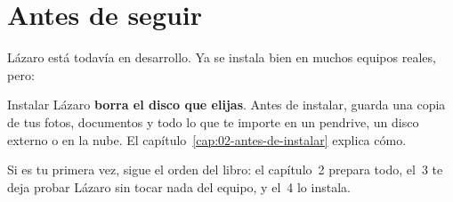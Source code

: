 \section{Antes de seguir}

Lázaro está todavía en desarrollo. Ya se instala bien en muchos equipos
reales, pero:
\begin{cuidado}
Instalar Lázaro \textbf{borra el disco que elijas}. Antes de instalar,
guarda una copia de tus fotos, documentos y todo lo que te importe en un
pendrive, un disco externo o en la nube. El capítulo~\ref{cap:02-antes-de-instalar}
explica cómo.
\end{cuidado}

Si es tu primera vez, sigue el orden del libro: el capítulo~2 prepara todo,
el~3 te deja probar Lázaro sin tocar nada del equipo, y el~4 lo instala.

\fuentes
